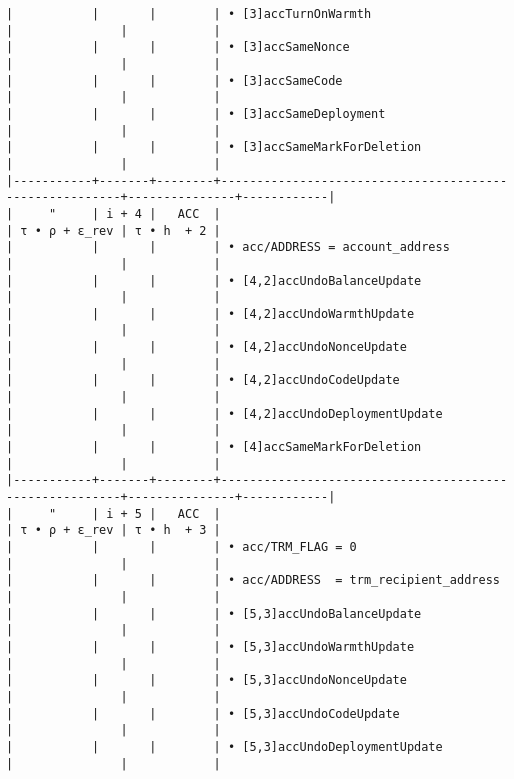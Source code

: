\documentclass[varwidth=\maxdimen,margin=0.5cm,multi={verbatim}]{standalone}
\begin{document}
\begin{verbatim}
|           |       |        | • [3]accTurnOnWarmth                                   |               |            |
|           |       |        | • [3]accSameNonce                                      |               |            |
|           |       |        | • [3]accSameCode                                       |               |            |
|           |       |        | • [3]accSameDeployment                                 |               |            |
|           |       |        | • [3]accSameMarkForDeletion                            |               |            |
|-----------+-------+--------+--------------------------------------------------------+---------------+------------|
|     "     | i + 4 |   ACC  |                                                        | τ • ρ + ε_rev | τ • h  + 2 |
|           |       |        | • acc/ADDRESS = account_address                        |               |            |
|           |       |        | • [4,2]accUndoBalanceUpdate                            |               |            |
|           |       |        | • [4,2]accUndoWarmthUpdate                             |               |            |
|           |       |        | • [4,2]accUndoNonceUpdate                              |               |            |
|           |       |        | • [4,2]accUndoCodeUpdate                               |               |            |
|           |       |        | • [4,2]accUndoDeploymentUpdate                         |               |            |
|           |       |        | • [4]accSameMarkForDeletion                            |               |            |
|-----------+-------+--------+--------------------------------------------------------+---------------+------------|
|     "     | i + 5 |   ACC  |                                                        | τ • ρ + ε_rev | τ • h  + 3 |
|           |       |        | • acc/TRM_FLAG = 0                                     |               |            |
|           |       |        | • acc/ADDRESS  = trm_recipient_address                 |               |            |
|           |       |        | • [5,3]accUndoBalanceUpdate                            |               |            |
|           |       |        | • [5,3]accUndoWarmthUpdate                             |               |            |
|           |       |        | • [5,3]accUndoNonceUpdate                              |               |            |
|           |       |        | • [5,3]accUndoCodeUpdate                               |               |            |
|           |       |        | • [5,3]accUndoDeploymentUpdate                         |               |            |

\end{verbatim}
\end{document}
